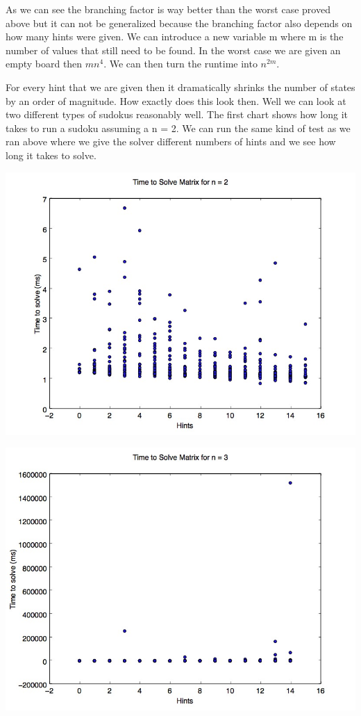 \documentclass{sig-alternate}
\begin{document}
As we can see the branching factor is way better than the worst case proved above but it can not be generalized because the branching factor also depends on how many hints were given. We can introduce a new variable m where m is the number of values that still need to be found. In the worst case we are given an empty board then $ m  n^4$. We can then turn the runtime into $n^{2m}$. 

For every hint that we are given then it dramatically shrinks the number of states by an order of magnitude. How exactly does this look then. Well we can look at two different types of sudokus reasonably well.
The first chart shows how long it takes to run a sudoku assuming a n = 2. We can run the same kind of test as we ran above where we give the solver different numbers of hints and we see how long it takes to solve. 

\includegraphics[width=\linewidth]{src/four.jpg}

\includegraphics[width=\linewidth]{src/nine.jpg}
\end{document}

